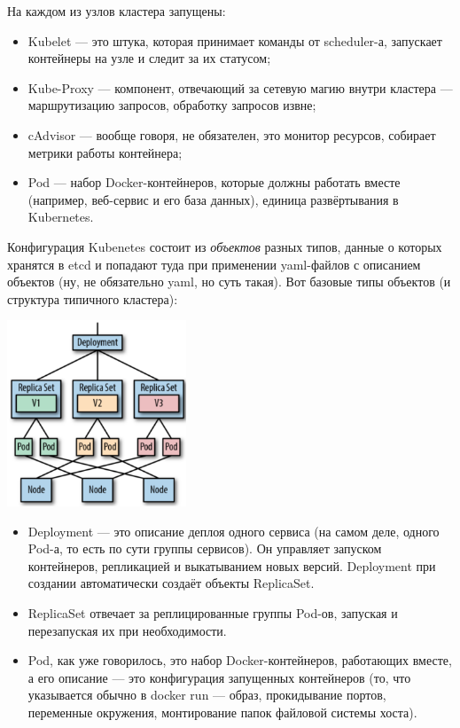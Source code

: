 \documentclass{../text-style}
\begin{document}
На каждом из узлов кластера запущены:

\begin{itemize}
    \item Kubelet --- это штука, которая принимает команды от scheduler-а, запускает контейнеры на узле и следит за их статусом;
    \item Kube-Proxy --- компонент, отвечающий за сетевую магию внутри кластера --- маршрутизацию запросов, обработку запросов извне;
    \item cAdvisor --- вообще говоря, не обязателен, это монитор ресурсов, собирает метрики работы контейнера;
    \item Pod --- набор Docker-контейнеров, которые должны работать вместе (например, веб-сервис и его база данных), единица развёртывания в Kubernetes.
\end{itemize}

Конфигурация Kubenetes состоит из \emph{объектов} разных типов, данные о которых хранятся в etcd и попадают туда при применении yaml-файлов с описанием объектов (ну, не обязательно yaml, но суть такая). Вот базовые типы объектов (и структура типичного кластера):

\begin{center}
    \includegraphics[width=0.4\textwidth]{kubernetesObjects.png}
\end{center}

\begin{itemize}
    \item Deployment --- это описание деплоя одного сервиса (на самом деле, одного Pod-а, то есть по сути группы сервисов). Он управляет запуском контейнеров, репликацией и выкатыванием новых версий. Deployment при создании автоматически создаёт объекты ReplicaSet.
    \item ReplicaSet отвечает за реплицированные группы Pod-ов, запуская и перезапуская их при необходимости.
    \item Pod, как уже говорилось, это набор Docker-контейнеров, работающих вместе, а его описание --- это конфигурация запущенных контейнеров (то, что указывается обычно в docker run --- образ, прокидывание портов, переменные окружения, монтирование папок файловой системы хоста).
\end{itemize}
\end{document}
